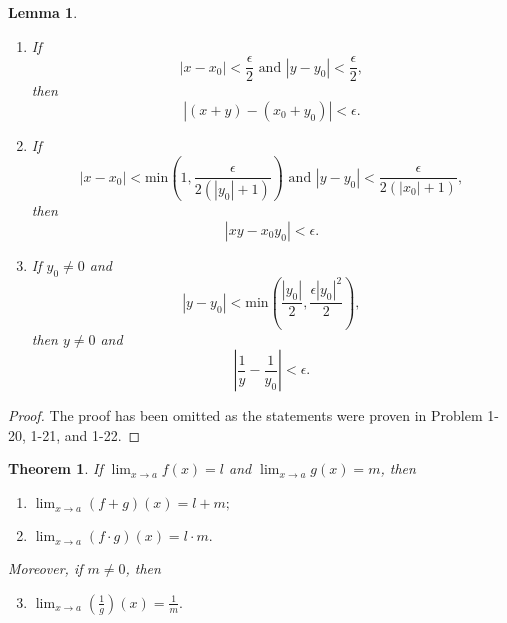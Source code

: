 \documentclass{article}
\newtheorem{theorem}{Theorem}
\newtheorem{lemma}{Lemma}
\begin{document}
\begin{lemma}
  \begin{enumerate}
    \item If \begin{equation*}
        |x - x_0| < \frac{\epsilon}{2} \text{ and } |y - y_0| <
          \frac{\epsilon}{2},
      \end{equation*} then \begin{equation*}
        |(x + y) - (x_0 + y_0)| < \epsilon.
      \end{equation*}
    \item If \begin{equation*}
        |x - x_0| < \mathrm{min}\left(1, \frac{\epsilon}{2(|y_0| + 1)}\right)
          \text{ and } |y - y_0| < \frac{\epsilon}{2(|x_0| + 1)},
      \end{equation*} then \begin{equation*}
        |xy - x_0y_0| < \epsilon.
      \end{equation*}
    \item If $y_0 \neq 0$ and \begin{equation*}
        |y - y_0| < \mathrm{min}\left(\frac{|y_0|}{2},
          \frac{\epsilon|y_0|^2}{2}\right),
      \end{equation*} then $y \neq 0$ and \begin{equation*}
        \left|\frac{1}{y} - \frac{1}{y_0}\right| < \epsilon.
      \end{equation*}
  \end{enumerate}
\end{lemma}

\begin{proof}
  The proof has been omitted as the statements were proven in Problem 1-20,
  1-21, and 1-22.
\end{proof}

\begin{theorem}
  If $\lim_{x \rightarrow a}f(x) = l$ and $\lim_{x \rightarrow a}g(x) = m$,
  then \begin{enumerate}
    \item $\lim_{x \rightarrow a}(f + g)(x) = l + m;$
    \item $\lim_{x \rightarrow a}(f \cdot g)(x) = l \cdot m.$
  \end{enumerate} Moreover, if $m \neq 0$, then \begin{enumerate}
    \setcounter{enumi}{2}
    \item $\lim_{x \rightarrow a}\left(\frac{1}{g}\right)(x) = \frac{1}{m}.$
  \end{enumerate}
\end{theorem}
\end{document}
